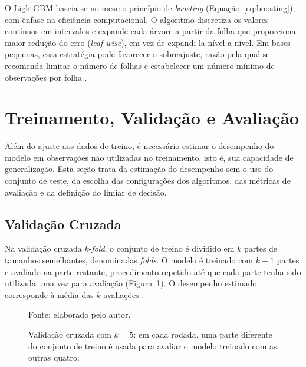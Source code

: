 O LightGBM \cite{Ke2017LightGBM} baseia-se no mesmo princípio de \textit{boosting} (Equação~\ref{eq:boosting}), com ênfase na eficiência computacional. O algoritmo discretiza os valores contínuos em intervalos e expande cada árvore a partir da folha que proporciona maior redução do erro (\textit{leaf-wise}), em vez de expandi-la nível a nível. Em bases pequenas, essa estratégia pode favorecer o sobreajuste, razão pela qual se recomenda limitar o número de folhas e estabelecer um número mínimo de observações por folha \cite{LightGBMDocsTuning}.

\section{Treinamento, Validação e Avaliação}
\label{sec:fund_validacao}

Além do ajuste aos dados de treino, é necessário estimar o desempenho do modelo em observações não utilizadas no treinamento, isto é, sua capacidade de generalização. Esta seção trata da estimação do desempenho sem o uso do conjunto de teste, da escolha das configurações dos algoritmos, das métricas de avaliação e da definição do limiar de decisão.

\subsection{Validação Cruzada}
\label{sec:fund_cv}

Na validação cruzada $k$-\textit{fold}, o conjunto de treino é dividido em $k$ partes de tamanhos semelhantes, denominadas \textit{folds}. O modelo é treinado com $k-1$ partes e avaliado na parte restante, procedimento repetido até que cada parte tenha sido utilizada uma vez para avaliação (Figura~\ref{fig:fund_cv}). O desempenho estimado corresponde à média das $k$ avaliações \cite{elementsofstatiscal}.

\begin{figure}[htbp]
\centering
{}
\caption{Validação cruzada com $k = 5$: em cada rodada, uma parte diferente do conjunto de treino é usada para avaliar o modelo treinado com as outras quatro.}
\label{fig:fund_cv}
{\small Fonte: elaborado pelo autor.}
\end{figure}

